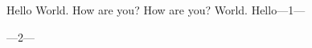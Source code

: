 \def\ta{Hello}
\def\tb{ World. }
\def\tc{How are you?}
\begingroup
\aftergroup\ta
\aftergroup\tb
\aftergroup\tc
\let\ua=\tc
\let\ub=\tb
\let\uc=\ta
\gdef\ta{I am}
\gdef\tb{ fine. }
\ua\ub\uc---1---\par
\endgroup
---2---
\bye

